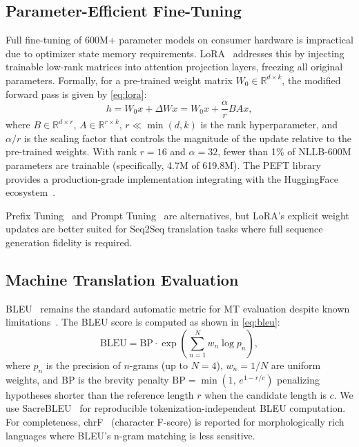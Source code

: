 \documentclass[conference]{IEEEtran}
\begin{document}
\subsection{Parameter-Efficient Fine-Tuning}

Full fine-tuning of 600M+ parameter models on consumer hardware is impractical due to
optimizer state memory requirements.
LoRA~\cite{hu2021lora} addresses this by injecting trainable low-rank matrices
into attention projection layers, freezing all original parameters.
Formally, for a pre-trained weight matrix $W_0 \in \mathbb{R}^{d \times k}$,
the modified forward pass is given by \eqref{eq:lora}:
\begin{equation}
  h = W_0 x + \Delta W x = W_0 x + \frac{\alpha}{r} B A x,
  \label{eq:lora}
\end{equation}
where $B \in \mathbb{R}^{d \times r}$, $A \in \mathbb{R}^{r \times k}$,
$r \ll \min(d,k)$ is the rank hyperparameter, and $\alpha/r$ is the scaling factor
that controls the magnitude of the update relative to the pre-trained weights.
With rank $r=16$ and $\alpha=32$, fewer than 1\% of NLLB-600M parameters are trainable
(specifically, 4.7M of 619.8M).
The PEFT library~\cite{peft2022} provides a production-grade implementation
integrating with the HuggingFace ecosystem~\cite{wolf2020transformers}.

Prefix Tuning~\cite{li2021prefix} and Prompt Tuning~\cite{lester2021power} are
alternatives, but LoRA's explicit weight updates are better suited for
Seq2Seq translation tasks where full sequence generation fidelity is required.

\subsection{Machine Translation Evaluation}

BLEU~\cite{papineni2002bleu} remains the standard automatic metric for MT evaluation
despite known limitations~\cite{callison2006re}.
The BLEU score is computed as shown in \eqref{eq:bleu}:
\begin{equation}
  \mathrm{BLEU} = \mathrm{BP} \cdot \exp\!\left(\sum_{n=1}^{N} w_n \log p_n\right),
  \label{eq:bleu}
\end{equation}
where $p_n$ is the precision of $n$-grams (up to $N=4$), $w_n = 1/N$ are uniform
weights, and $\mathrm{BP}$ is the brevity penalty
$\mathrm{BP} = \min\!\left(1,\, e^{1 - r/c}\right)$ penalizing hypotheses shorter
than the reference length $r$ when the candidate length is $c$.
We use SacreBLEU~\cite{post2018call} for reproducible tokenization-independent BLEU
computation.
For completeness, chrF~\cite{popovic2015chrf} (character F-score) is reported for
morphologically rich languages where BLEU's n-gram matching is less sensitive.
\end{document}
